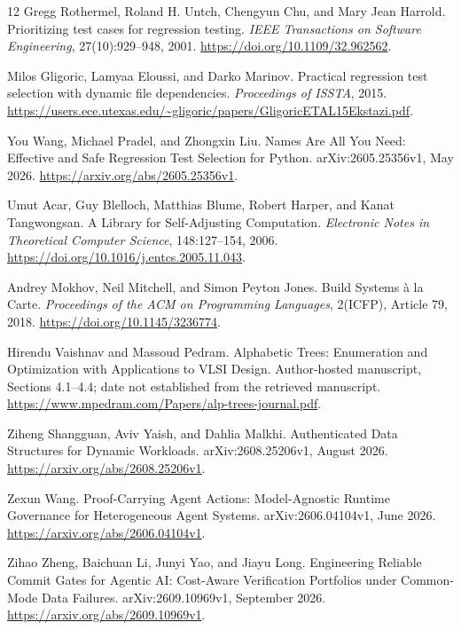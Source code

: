\begin{thebibliography}{12}
 Gregg Rothermel, Roland H. Untch, Chengyun Chu, and Mary Jean Harrold.
\newblock Prioritizing test cases for regression testing.
\newblock \emph{IEEE Transactions on Software Engineering}, 27(10):929--948, 2001.
\newblock \url{https://doi.org/10.1109/32.962562}.

 Milos Gligoric, Lamyaa Eloussi, and Darko Marinov.
\newblock Practical regression test selection with dynamic file dependencies.
\newblock \emph{Proceedings of ISSTA}, 2015.
\newblock \url{https://users.ece.utexas.edu/~gligoric/papers/GligoricETAL15Ekstazi.pdf}.

 You Wang, Michael Pradel, and Zhongxin Liu.
\newblock Names Are All You Need: Effective and Safe Regression Test Selection for Python.
\newblock arXiv:2605.25356v1, May 2026.
\newblock \url{https://arxiv.org/abs/2605.25356v1}.

 Umut Acar, Guy Blelloch, Matthias Blume, Robert Harper, and Kanat Tangwongsan.
\newblock A Library for Self-Adjusting Computation.
\newblock \emph{Electronic Notes in Theoretical Computer Science}, 148:127--154, 2006.
\newblock \url{https://doi.org/10.1016/j.entcs.2005.11.043}.

 Andrey Mokhov, Neil Mitchell, and Simon Peyton Jones.
\newblock Build Systems \`a la Carte.
\newblock \emph{Proceedings of the ACM on Programming Languages}, 2(ICFP), Article 79, 2018.
\newblock \url{https://doi.org/10.1145/3236774}.

 Hirendu Vaishnav and Massoud Pedram.
\newblock Alphabetic Trees: Enumeration and Optimization with Applications to VLSI Design.
\newblock Author-hosted manuscript, Sections 4.1--4.4; date not established from the retrieved manuscript.
\newblock \url{https://www.mpedram.com/Papers/alp-trees-journal.pdf}.

 Ziheng Shangguan, Aviv Yaish, and Dahlia Malkhi.
\newblock Authenticated Data Structures for Dynamic Workloads.
\newblock arXiv:2608.25206v1, August 2026.
\newblock \url{https://arxiv.org/abs/2608.25206v1}.

 Zexun Wang.
\newblock Proof-Carrying Agent Actions: Model-Agnostic Runtime Governance for Heterogeneous Agent Systems.
\newblock arXiv:2606.04104v1, June 2026.
\newblock \url{https://arxiv.org/abs/2606.04104v1}.

 Zihao Zheng, Baichuan Li, Junyi Yao, and Jiayu Long.
\newblock Engineering Reliable Commit Gates for Agentic AI: Cost-Aware Verification Portfolios under Common-Mode Data Failures.
\newblock arXiv:2609.10969v1, September 2026.
\newblock \url{https://arxiv.org/abs/2609.10969v1}.


\end{thebibliography}
